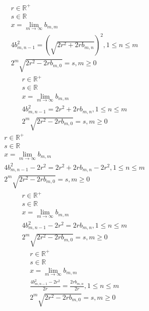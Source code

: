 \documentclass[a4paper,12pt]{report}
\begin{document}
\begin{subequations}
\begin{gather}
r \in \mathbb{R}^+ \\
s \in \mathbb{R} \\
x = \lim \limits_{m \to \infty} b_{m,m} \\
4b_{m,n-1}^2 = \left(\sqrt{2r^2 + 2rb_{m,n}}\right)^2, 1 \leq n \leq m \\
2^m \sqrt{2r^2 - 2rb_{m,0}} = s, m \geq 0
\end{gather}
\end{subequations}
\begin{subequations}
\begin{gather}
r \in \mathbb{R}^+ \\
s \in \mathbb{R} \\
x = \lim \limits_{m \to \infty} b_{m,m} \\
4b_{m,n-1}^2 = 2r^2 + 2rb_{m,n}, 1 \leq n \leq m \\
2^m \sqrt{2r^2 - 2rb_{m,0}} = s, m \geq 0
\end{gather}
\end{subequations}
\begin{subequations}
\begin{gather}
r \in \mathbb{R}^+ \\
s \in \mathbb{R} \\
x = \lim \limits_{m \to \infty} b_{m,m} \\
4b_{m,n-1}^2 - 2r^2 = 2r^2 + 2rb_{m,n} - 2r^2, 1 \leq n \leq m \\
2^m \sqrt{2r^2 - 2rb_{m,0}} = s, m \geq 0
\end{gather}
\end{subequations}
\begin{subequations}
\begin{gather}
r \in \mathbb{R}^+ \\
s \in \mathbb{R} \\
x = \lim \limits_{m \to \infty} b_{m,m} \\
4b_{m,n-1}^2 - 2r^2 = 2rb_{m,n}, 1 \leq n \leq m \\
2^m \sqrt{2r^2 - 2rb_{m,0}} = s, m \geq 0
\end{gather}
\end{subequations}
\begin{subequations}
\begin{gather}
r \in \mathbb{R}^+ \\
s \in \mathbb{R} \\
x = \lim \limits_{m \to \infty} b_{m,m} \\
\frac{4b_{m,n-1}^2 - 2r^2}{2r} = \frac{2rb_{m,n}}{2r}, 1 \leq n \leq m \\
2^m \sqrt{2r^2 - 2rb_{m,0}} = s, m \geq 0
\end{gather}
\end{subequations}
\end{document}
